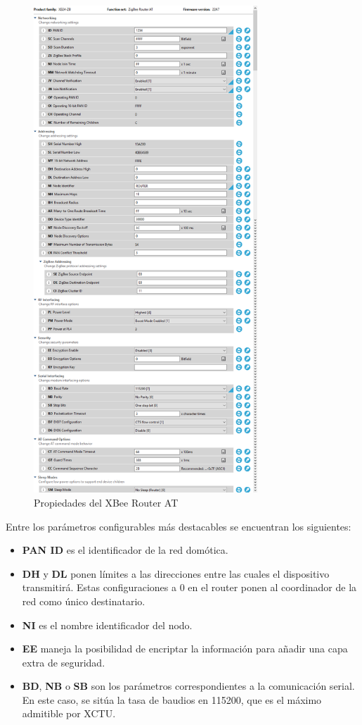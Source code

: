 \begin{figure}[H]
\centering
\includegraphics[width=0.75\textwidth]{figuras/XCTUPropRou.png}
\caption{Propiedades del XBee Router AT}
\label{fig:XCTUPropRou}
\end{figure}

Entre los parámetros configurables más destacables se encuentran los siguientes:

\begin{itemize}
\item \textbf{PAN ID} es el identificador de la red domótica.
\item \textbf{DH} y \textbf{DL} ponen límites a las direcciones entre las cuales el dispositivo transmitirá. Estas configuraciones a 0 en el router ponen al coordinador de la red como único destinatario.
\item \textbf{NI} es el nombre identificador del nodo.
\item \textbf{EE} maneja la posibilidad de encriptar la información para añadir una capa extra de seguridad.
\item \textbf{BD}, \textbf{NB} o \textbf{SB} son los parámetros correspondientes a la comunicación serial. En este caso, se sitúa la tasa de baudios en 115200, que es el máximo admitible por XCTU.
\end{itemize}

